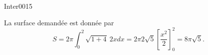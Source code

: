 \begin{corrige}{Inter0015}

La surface demandée est donnée par
\begin{equation}
	S=2\pi\int_0^2\sqrt{1+4}\ 2xdx=2\pi2\sqrt{5}\left[\frac{ x^2 }{ 2 }\right]_0^2=8\pi\sqrt{5}.
\end{equation}


\end{corrige}
